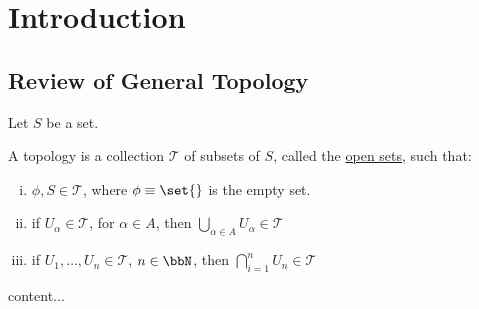 
\section{Introduction}
\label{Section1}

\subsection{Review of General Topology}

Let $S$ be a set.

\begin{definition}
	A topology is a collection $\mathcal{T}$ of subsets of $S$, called the \underline{open sets}, such that:
	\begin{enumerate}[(i)]
		\item $\phi, S \in \mathcal{T}$, where $\phi\equiv\set{}$ is the empty set.
		\item if $U_\alpha \in \mathcal{T}$, for $\alpha\in A$, then $\bigcup_{\alpha\in A} U_\alpha \in \mathcal{T}$
		\item if $U_1, \dots, U_n \in \mathcal{T}$, $n \in \bbN$, then $\bigcap_{i=1}^n U_n \in \mathcal{T}$  
	\end{enumerate}
\end{definition}

\begin{example}
	content...
\end{example}